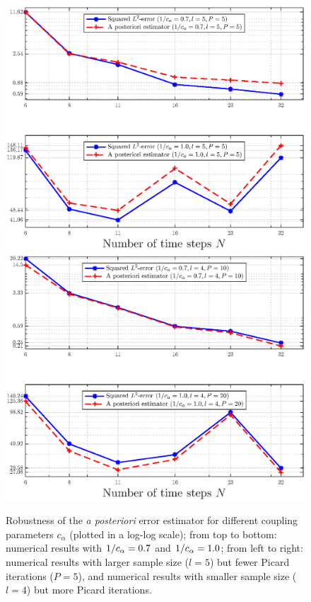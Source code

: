 \documentclass[11pt]{article}
\numberwithin{equation}{section}
\theoremstyle{definition}
\theoremstyle{remark}
\begin{document}
\begin{figure}[!ht]
\centering
\hspace{-12mm}
\includegraphics[trim=43 10 3 30, clip, width=0.54\columnwidth,keepaspectratio]{strong_coupling_c_alpha_2cases_P5}
\hspace{-7mm}
    \includegraphics[trim=43 10 3 30, clip, width=0.54\columnwidth,keepaspectratio]{strong_coupling_c_alpha_2cases_Plarge}
\hspace{-20mm}    
\caption{
Robustness of  the \textit{a posteriori} error estimator for different
coupling parameters  $c_\alpha$
(plotted in a log-log scale);
from top to bottom: numerical results with $1/c_\alpha=0.7$ and  $1/c_\alpha=1.0$;
from left to right: numerical results with larger sample size ($l=5$) but fewer Picard iterations ($P=5$),
and numerical results with smaller sample size ($l=4$) but more Picard iterations.
}
\label{fig:coupling}
\end{figure}
\end{document}

